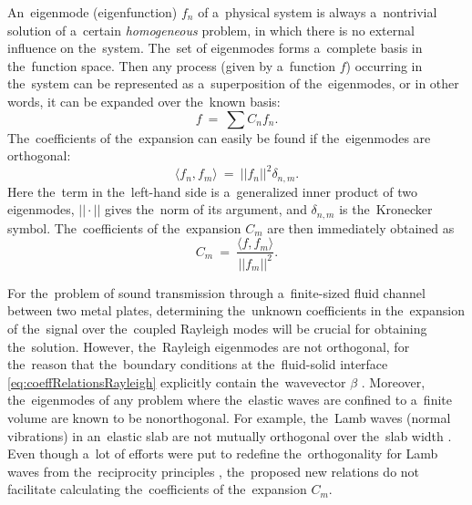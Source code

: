 An~eigenmode (eigenfunction) $f_n$ of a~physical system is always a~nontrivial solution of a~certain \textit{homogeneous} problem, in which there is no external influence on the~system.
The~set of eigenmodes forms a~complete basis in the~function space.
Then any process (given by a~function $f$) occurring in the~system can be represented as a~superposition of the~eigenmodes, or in other words, it can be expanded over the~known basis:
\begin{equation}
\label{eq:basisRayleigh}
f~=~\sum C_n f_n.
\end{equation}
The~coefficients of the~expansion can easily be found if the~eigenmodes are orthogonal:
\begin{equation}
\langle f_n, f_m \rangle~=~||f_n||^2\delta_{n,m}.
\end{equation}
Here the~term in the~left-hand side is a~generalized inner product of two eigenmodes, $||\cdot||$ gives the~norm of its argument, and $\delta_{n,m}$ is the~Kronecker symbol.
The~coefficients of the~expansion $C_m$ are then immediately obtained as
\begin{equation}
C_m~=~\frac{\langle f, f_m\rangle}{||f_m||^2}.
\end{equation}

For the~problem of sound transmission through a~finite-sized fluid channel between two metal plates, determining the~unknown coefficients in the~expansion of the~signal over the~coupled Rayleigh modes will be crucial for obtaining the~solution.
However, the~Rayleigh eigenmodes are not orthogonal, for the~reason that the~boundary conditions at the~fluid-solid interface \cref{eq:coeffRelationsRayleigh} explicitly contain the~wavevector $\beta$ \cite{bobrovnitskii}.
Moreover, the~eigenmodes of any problem where the~elastic waves are confined to a~finite volume are known to be nonorthogonal.
For example, the~Lamb waves (normal vibrations) in an~elastic slab are not mutually orthogonal over the~slab width \cite{lyon}.
Even though a~lot of efforts were put to redefine the~orthogonality for Lamb waves from the~reciprocity principles \cite{bobrovnitskii,achenbac,zakharov,folk}, the~proposed new relations do not facilitate calculating the~coefficients of the~expansion $C_m$. 

